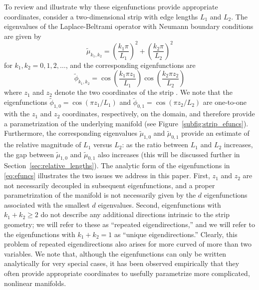 \documentclass[3p]{elsarticle}
\begin{document}
To review and illustrate why these eigenfunctions provide appropriate coordinates, consider a two-dimensional strip with edge lengths $L_1$ and $L_2$.
%
The eigenvalues of the Laplace-Beltrami operator with Neumann boundary conditions are given by
\begin{equation} \label{eq:evals}
\tilde{\mu}_{k_1, k_2} = \left( \frac{k_1 \pi}{L_1} \right)^2 + \left( \frac{k_2 \pi}{L_2} \right)^2
\end{equation}
for $k_1, k_2 = 0, 1, 2, \dots$,
and the corresponding eigenfunctions are
\begin{equation} \label{eq:efuncs}
\tilde{\phi}_{k_1, k_2} = \cos \left( \frac{k_1 \pi z_1}{L_1} \right) \cos \left( \frac{k_2 \pi z_2}{L_2} \right)
\end{equation}
where $z_1$ and $z_2$ denote the two coordinates of the strip \cite{singer2008non}.
%
We note that the eigenfunctions $\tilde{\phi}_{1, 0} = \cos \left( {\pi z_1}/{L_1} \right)$ and
$\tilde{\phi}_{0, 1} = \cos \left( {\pi z_2}/{L_2} \right)$ are one-to-one with the $z_1$ and $z_2$ coordinates,
respectively, on the domain, and therefore provide a parametrization of the underlying manifold (see Figure~\ref{subfig:strip_efuncs}).
%
Furthermore, the corresponding eigenvalues $\tilde{\mu}_{1,0}$ and $\tilde{\mu}_{0,1}$ provide an estimate of the
relative magnitude of $L_1$ versus $L_2$: as the ratio between $L_1$ and $L_2$ increases,
the gap between $\tilde{\mu}_{1,0}$ and $\tilde{\mu}_{0,1}$ also increases
(this will be discussed further in Section~\ref{sec:relative_lengths}).
%
The analytic form of the eigenfunctions in \eqref{eq:efuncs} illustrates the two issues we address in this paper.
%
First, $z_1$ and $z_2$ are not necessarily decoupled in subsequent eigenfunctions,
and a proper parametrization of the manifold is not necessarily given by the $d$ eigenfunctions associated with the
smallest $d$ eigenvalues.
%
Second, eigenfunctions with $k_1+k_2 \ge 2$ do not describe any
additional directions intrinsic to the strip geometry; we will refer to these as ``repeated eigendirections,''
and we will refer to the eigenfunctions with $k_1+k_2 =1$ as ``unique eigendirections.''
%
Clearly, this problem of repeated eigendirections also arises for more curved of more than two variables.
%
We note that, although the eigenfunctions can only be written analytically for very special cases,
it has been observed empirically that they often provide appropriate coordinates
to usefully parametrize more complicated, nonlinear manifolds.
%
\end{document}
